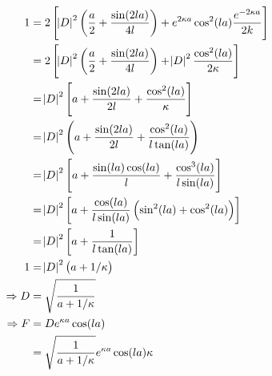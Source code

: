 \documentclass{article}
\begin{document}
	\begin{align*}
		1 &= 2 \left[ \abs{D}^2 \left(\dfrac{a}{2} + \dfrac{\sin(2la)}{4l}\right) + 	e^{2\kappa a} \cos^{2}(la) \frac{e^{-2\kappa a}}{2k}\right] \\
		&= 2 \left[ \abs{D}^2 \left(\dfrac{a}{2} + \dfrac{\sin(2la)}{4l}\right) + \abs{D}^2 	\dfrac{\cos^{2}(la)}{2\kappa}\right] \\
		&= \abs{D}^2 \left[a + \dfrac{\sin(2la)}{2l} + \dfrac{\cos^{2}(la)}{\kappa}\right] \\
		&= \abs{D}^2 \left(a + \dfrac{\sin(2la)}{2l} + \dfrac{\cos^{2}(la)}{l 	\tan(la)}\right) \\
		&= \abs{D}^2 \left[ a + \dfrac{\sin(la)\cos(la)}{l} + \frac{\cos^{3}(la)}{l 	\sin(la)}\right] \\
		&= \abs{D}^2 \left[a + \dfrac{\cos(la)}{l \sin(la)} \left(\sin^2(la) + 	\cos^2(la)\right)\right] \\
		&= \abs{D}^2 \left[a + \dfrac{1}{l \tan(la)}\right] \\
		1 &= \abs{D}^2 \left(a + 1/\kappa \right) \\
		\Rightarrow D &= \sqrt{\dfrac{1}{a + 1/\kappa }} \\
		\Rightarrow F &= D e^{\kappa a} \cos(la) \\
		&= \sqrt{\dfrac{1}{a + 1/\kappa }} e^{\kappa a} \cos(la)\kappa
	\end{align*}
	
	
\end{document}
